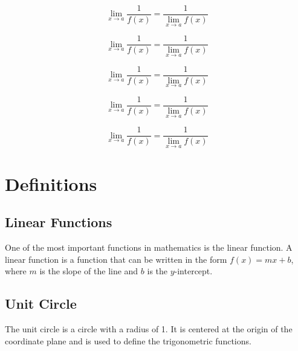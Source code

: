 \documentclass{book}
\begin{document}
\begin{equation}
    \lim_{x \to a} \frac{1}{f(x)} = \frac{1}{\lim_{x \to a} f(x)}
\end{equation}

\begin{equation}
    \lim_{x \to a} \frac{1}{f(x)} = \frac{1}{\lim_{x \to a} f(x)}
\end{equation}

\begin{equation}
    \lim_{x \to a} \frac{1}{f(x)} = \frac{1}{\lim_{x \to a} f(x)}
\end{equation}

\begin{equation}
    \lim_{x \to a} \frac{1}{f(x)} = \frac{1}{\lim_{x \to a} f(x)}
\end{equation}

\begin{equation}
    \lim_{x \to a} \frac{1}{f(x)} = \frac{1}{\lim_{x \to a} f(x)}
\end{equation}



\chapter{Definitions}
\section{Linear Functions}
One of the most important functions in mathematics is the linear function. A linear function is a function that can be written in the form $f(x) = mx + b$, where $m$ is the slope of the line and $b$ is the $y$-intercept.

\section{Unit Circle}
The unit circle is a circle with a radius of 1. It is centered at the origin of the coordinate plane and is used to define the trigonometric functions.
\end{document}
